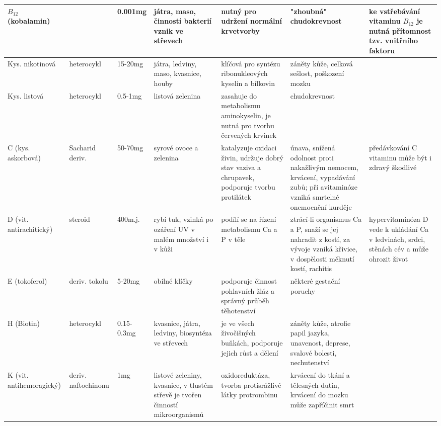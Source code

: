 \documentclass{article}
\begin{document}
\begin{landscape}
\begin{longtable}{| m{7em} | m{5em} | m{5em} | m{8em}<{\RaggedRight} | m{15em}<{\RaggedRight} | m{15em}<{\RaggedRight} | m{10em}<{\RaggedRight} |}
            \hline
            $B_{12}$ (kobalamin)& & 0.001mg & játra, maso, činností bakterií vznik ve střevech & nutný pro udržení normální krvetvorby & "zhoubná" chudokrevnost & ke vstřebávání vitaminu $B_{12}$ je nutná přítomnost tzv. vnitřního faktoru \\
        \endfirsthead
            \hline
            Kys. nikotinová & heterocykl & 15-20mg & játra, ledviny, maso, kvasnice, houby & klíčová pro syntézu ribonukleových kyselin a bílkovin & záněty kůže, celková sešlost, poškození mozku& \\
            \hline
            Kys. listová & heterocykl & 0.5-1mg & listová zelenina & zasahuje do metabolismu aminokyselin, je nutná pro tvorbu červených krvinek & chudokrevnost & \\
            \hline
            C (kys. askorbová) & Sacharid deriv. & 50-70mg & syrové ovoce a zelenina & katalyzuje oxidaci živin, udržuje dobrý stav vaziva a chrupavek, podporuje tvorbu protilátek & únava, snížená odolnost proti nakažlivým nemocem, krvácení, vypadávání zubů; při avitaminóze vzniká smrtelné onemocnění kurděje & předávkování C vitaminu může být i zdravý škodlivé \\
            \hline
            D (vit. antirachitický) & steroid & 400m.j. & rybí tuk, vzinká po ozáření UV v malém množství i v kůži & podílí se na řízení metabolismu Ca a P v těle & ztrácí-li organismus Ca a P, snaží se jej nahradit z kostí, za vývoje vzniká křivice, v dospělosti měknutí kostí, rachitis & hypervitaminóza D vede k ukládání Ca v ledvinách, srdci, stěnách cév a může ohrozit život \\
            \hline
            E (tokoferol) & deriv. tokolu & 5-20mg & obilné klíčky & podporuje činnost pohlavních žláz a správný průběh těhotenství & některé gestační poruchy & \\
            \hline
            H (Biotin) & heterocykl & 0.15-0.3mg & kvasnice, játra, ledviny, biosyntéza ve střevech & je ve všech živočišných buňkách, podporuje jejich růst a dělení & záněty kůže, atrofie papil jazyka, unavenost, deprese, svalové bolesti, nechutenství & \\
            \hline
            K (vit. antihemoragický) & deriv. naftochinonu & 1mg & listové zeleniny, kvasnice, v tlustém střevě je tvořen činností mikroorganismů & oxidoreduktáza, tvorba protisrážlivé látky protrombinu & krvácení do tkání a tělesných dutin, krvácení do mozku může zapříčinit smrt & \\
            \hline
        \end{longtable}
    \end{landscape}
\end{document}
